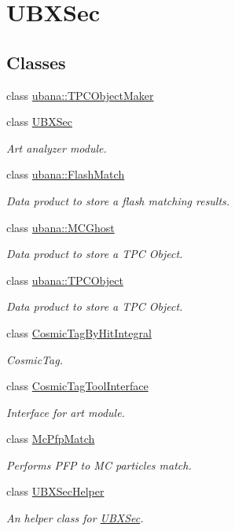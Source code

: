 \hypertarget{group__UBXSec}{\section{\-U\-B\-X\-Sec}
\label{group__UBXSec}
}
\subsection*{\-Classes}
\begin{DoxyCompactItemize}
\item 
class \hyperlink{classubana_1_1TPCObjectMaker}{ubana\-::\-T\-P\-C\-Object\-Maker}
\item 
class \hyperlink{classUBXSec}{\-U\-B\-X\-Sec}
\begin{DoxyCompactList}\small\item\em \-Art analyzer module. \end{DoxyCompactList}\item 
class \hyperlink{classubana_1_1FlashMatch}{ubana\-::\-Flash\-Match}
\begin{DoxyCompactList}\small\item\em \-Data product to store a flash matching results. \end{DoxyCompactList}\item 
class \hyperlink{classubana_1_1MCGhost}{ubana\-::\-M\-C\-Ghost}
\begin{DoxyCompactList}\small\item\em \-Data product to store a \-T\-P\-C \-Object. \end{DoxyCompactList}\item 
class \hyperlink{classubana_1_1TPCObject}{ubana\-::\-T\-P\-C\-Object}
\begin{DoxyCompactList}\small\item\em \-Data product to store a \-T\-P\-C \-Object. \end{DoxyCompactList}\item 
class \hyperlink{classCosmicTagByHitIntegral}{\-Cosmic\-Tag\-By\-Hit\-Integral}
\begin{DoxyCompactList}\small\item\em \-Cosmic\-Tag. \end{DoxyCompactList}\item 
class \hyperlink{classCosmicTagToolInterface}{\-Cosmic\-Tag\-Tool\-Interface}
\begin{DoxyCompactList}\small\item\em \-Interface for art module. \end{DoxyCompactList}\item 
class \hyperlink{classMcPfpMatch}{\-Mc\-Pfp\-Match}
\begin{DoxyCompactList}\small\item\em \-Performs \-P\-F\-P to \-M\-C particles match. \end{DoxyCompactList}\item 
class \hyperlink{classUBXSecHelper}{\-U\-B\-X\-Sec\-Helper}
\begin{DoxyCompactList}\small\item\em \-An helper class for \hyperlink{classUBXSec}{\-U\-B\-X\-Sec}. \end{DoxyCompactList}\end{DoxyCompactItemize}
